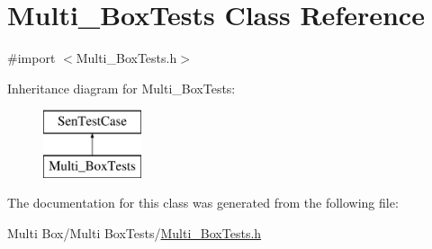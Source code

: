 \hypertarget{interface_multi___box_tests}{\section{Multi\-\_\-\-Box\-Tests Class Reference}
\label{interface_multi___box_tests}
}


{\ttfamily \#import $<$Multi\-\_\-\-Box\-Tests.\-h$>$}

Inheritance diagram for Multi\-\_\-\-Box\-Tests\-:\begin{figure}[H]
\begin{center}
\leavevmode
\includegraphics[height=2.000000cm]{interface_multi___box_tests}
\end{center}
\end{figure}


The documentation for this class was generated from the following file\-:\begin{DoxyCompactItemize}
\item 
Multi Box/\-Multi Box\-Tests/\hyperlink{_multi___box_tests_8h}{Multi\-\_\-\-Box\-Tests.\-h}\end{DoxyCompactItemize}
